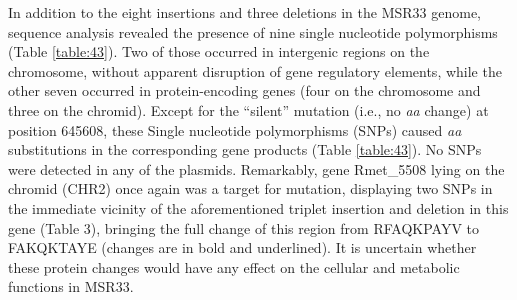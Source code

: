 In addition to the eight insertions and three deletions in the MSR33 genome, sequence analysis revealed the presence of nine single nucleotide polymorphisms (Table \ref{table:43}). Two of those occurred in intergenic regions on the chromosome, without apparent disruption of gene regulatory elements, while the other seven occurred in protein-encoding genes (four on the chromosome and three on the chromid). Except for the “silent” mutation (i.e., no \textit{aa} change) at position 645608, these Single nucleotide polymorphisms (SNPs) caused \textit{aa} substitutions in the corresponding gene products (Table \ref{table:43}). No SNPs were detected in any of the plasmids. Remarkably, gene Rmet\_5508 lying on the chromid (CHR2) once again was a target for mutation, displaying two SNPs in the immediate vicinity of the aforementioned triplet insertion and deletion in this gene (Table 3), bringing the full change of this region from RFAQKPAYV to FAKQKTAYE (changes are in bold and underlined). It is uncertain whether these protein changes would have any effect on the cellular and metabolic functions in MSR33.
